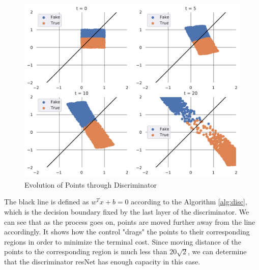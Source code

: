 \begin{figure}[H]
    \centering
    \includegraphics[width = 13cm]{Evo_1.pdf}
    \caption{Evolution of Points through Discriminator}
    \label{fig:evo_1}
\end{figure}
The black line is defined as $w^Tx +b =0$ according to the Algorithm \ref{alg:disc}, which is the decision boundary fixed by the last layer of the discriminator. We can see that as the process goes on, points are moved further away from the line accordingly. It shows how the control "drags" the points to their corresponding regions in order to minimize the terminal cost. Since moving distance of the points to the corresponding region is much less than $20\sqrt{2}$, we can determine that the discriminator resNet has enough capacity in this case.

